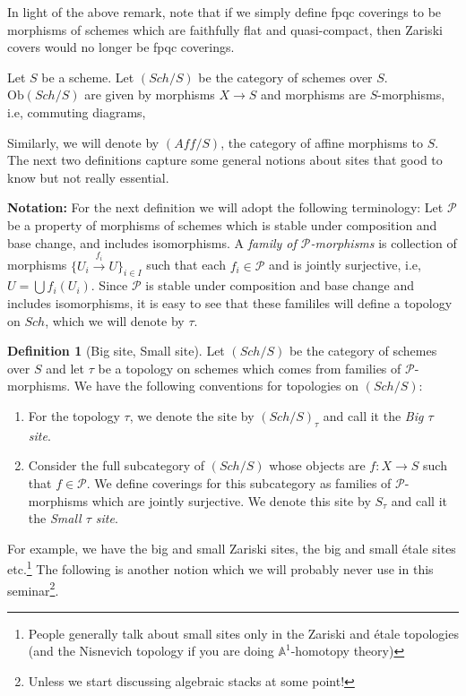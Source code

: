 \documentclass[11pt]{amsart}
\newcommand{\A}{{\mathbb A}}
\newcommand{\Ob}{\text{Ob}}
\theoremstyle{definition}
\newtheorem{definition}[theorem]{Definition}
\begin{document}
In light of the above remark, note that if we simply define fpqc coverings to be morphisms of schemes which are faithfully flat and quasi-compact, then Zariski covers would no longer be fpqc coverings.


Let $S$ be a scheme. Let $(\mathit{Sch}/S)$ be the category of schemes over $S$. $\Ob(\mathit{Sch}/S)$ are given by morphisms $X\rightarrow S$ and morphisms are $S$-morphisms, i.e, commuting diagrams,
\begin{center}
\end{center}
Similarly, we will denote by $(\mathit{Aff}/S)$, the category of affine morphisms to $S$.\\

The next two definitions capture some general notions about sites that good to know but not really essential.

\noindent\textbf{Notation:} For the next definition we will adopt the following terminology: Let $\mathcal{P}$ be a property of morphisms of schemes which is stable under composition and base change, and includes isomorphisms. A \textit{family of $\mathcal{P}$-morphisms} is collection of morphisms $\{U_i \overset{f_i}{\to} U\}_{i\in I}$ such that each $f_i\in \mathcal{P}$ and is jointly surjective, i.e, $U = \bigcup f_i(U_i)$. Since $\mathcal{P}$ is stable under composition and base change and includes isomorphisms, it is easy to see that these famililes will define a topology on $\mathit{Sch}$, which we will denote by $\tau$.


\begin{definition}[Big site, Small site]\label{definition-big-small-site}
	Let $(\mathit{Sch}/S)$ be the category of schemes over $S$ and let $\tau$ be a topology on schemes which comes from families of $\mathcal{P}$-morphisms. We have the following conventions for topologies on $(\mathit{Sch}/S)$:
	\begin{enumerate}
		\item[\textsc{Big site:}] For the topology $\tau$, we denote the site by $(\mathit{Sch}/S)_{\tau}$ and call it the \textit{Big $\tau$ site}.
		\item[\textsc{Small site:}] Consider the full subcategory of $(\mathit{Sch}/S)$ whose objects are $f: X\rightarrow S$ such that $f\in\mathcal{P}$. We define coverings for this subcategory as families of $\mathcal{P}$-morphisms which are jointly surjective. We denote this site by $S_{\tau}$ and call it the \textit{Small $\tau$ site}.
	\end{enumerate}
\end{definition}
For example, we have the big and small Zariski sites, the big and small \'{e}tale sites etc.\footnote{People generally talk about small sites only in the Zariski and \'{e}tale topologies (and the Nisnevich topology if you are doing $\A^1$-homotopy theory)} The following is another notion which we will probably never use in this seminar\footnote{Unless we start discussing algebraic stacks at some point!}.
\end{document}
